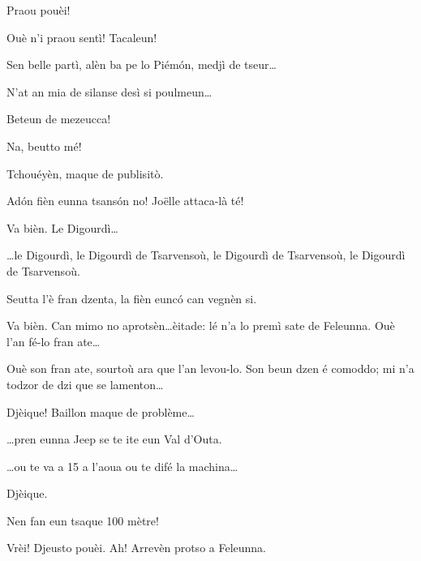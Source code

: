 \begin{drama}
\Jordyspeaks Praou pouèi!

\Chauffeurspeaks Ouè n'i praou sentì! Tacaleun!


\Joelspeaks Sen belle partì, alèn ba pe lo Piém\'on, medjì de tseur\ldots 


\Joelspeaks N'at an mia de silanse desì si poulmeun\ldots

\Thierryspeaks Beteun de mezeucca!


\Chauffeur Na, beutto mé!


\Chauffeurspeaks Tchouéyèn, maque de publisitò.

\Joelspeaks Ad\'on fièn eunna tsans\'on no! Jo\"{e}lle attaca-là té!

\Joellespeaks Va bièn.  Le Digourdì\ldots

\Tcheuttespeaks{} \ldots le Digourdì, le Digourdì de Tsarvensoù, le Digourdì de Tsarvensoù, le Digourdì de Tsarvensoù.

\Joelspeaks Seutta l'è fran dzenta, la fièn euncó can vegnèn si.

\Chauffeurspeaks Va bièn. Can mimo no aprotsèn\ldots èitade: lé n'a lo premì sate de Feleunna. Ouè l'an fé-lo fran ate\ldots


\Joelspeaks Ouè son fran ate, sourtoù ara que l'an levou-lo. Son beun dzen é comoddo; mi n'a todzor de dzi que se lamenton\ldots

\Chauffeurspeaks Djèique! Baillon maque de problème\ldots

\Joelspeaks{} \ldots pren eunna Jeep se te ite eun Val d'Outa.

\Chauffeurspeaks{} \ldots ou te va a 15 a l'aoua ou te difé la machina\ldots

\Joelspeaks Djèique.

\Chauffeurspeaks Nen fan eun tsaque 100 mètre!

\Joelspeaks Vrèi! Djeusto pouèi. Ah! Arrevèn protso a Feleunna.


\end{drama}
